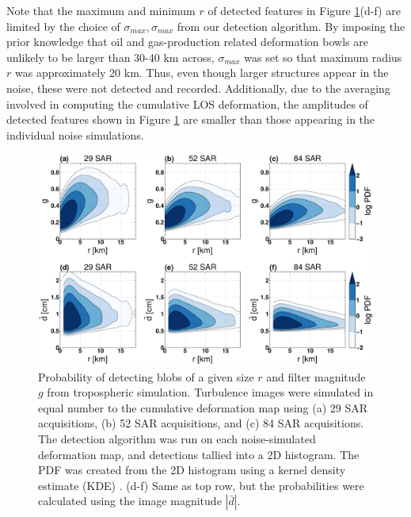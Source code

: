 \documentclass{utexasthesis}
\begin{document}
Note that the maximum and minimum $r$ of detected features in Figure \ref{fig:results-kde}(d-f) are limited by the choice of $\sigma_{max}, \sigma_{max}$ from our detection algorithm. By imposing the prior knowledge that oil and gas-production related deformation bowls are unlikely to be larger than 30-40 km across, $\sigma_{max}$ was set so that maximum radius $r$ was approximately 20 km. Thus, even though larger structures appear in the noise, these were not detected and recorded. Additionally, due to the averaging involved in computing the cumulative LOS deformation, the amplitudes of detected features shown in Figure \ref{fig:results-kde} are smaller than those appearing in the individual noise simulations.


\begin{figure}[hbt!]
\centering 
\includegraphics[width=0.98\linewidth]{paper2/figures/figure_results_kde.pdf}
\caption{
Probability of detecting blobs of a given size $r$ and filter magnitude $g$ from tropospheric simulation. Turbulence images were simulated in equal number to the cumulative deformation map using (a) 29 SAR acquisitions, (b) 52 SAR acquisitions, and (c) 84 SAR acquisitions. The detection algorithm was run on each noise-simulated deformation map, and detections tallied into a 2D histogram. The PDF was created from the 2D histogram using a kernel density estimate (KDE) \citep{Scott2015MultivariateDensityEstimation}.
(d-f) Same as top row, but the probabilities were calculated using the image magnitude $|\bar{d}|$.
}
\label{fig:results-kde}
\end{figure}

\end{document}
